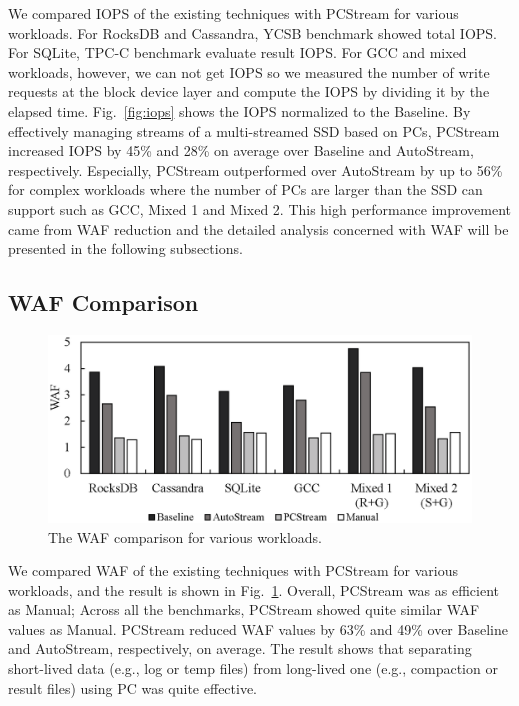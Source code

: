 We compared IOPS of the existing techniques with \textsf{\small PCStream} for various 
workloads.
For RocksDB and Cassandra, YCSB benchmark showed total IOPS.
For SQLite, TPC-C benchmark evaluate result IOPS.
For GCC and mixed workloads, however, we can not get IOPS so
we measured the number of write requests at the block
device layer and compute the IOPS by dividing it by the elapsed time.
Fig.~\ref{fig:iops} shows the IOPS normalized to the \textsf{\small Baseline}.
By effectively managing streams of a multi-streamed SSD based on PCs,
\textsf{\small PCStream} increased IOPS by 45\% and 28\% on average over
\textsf{\small Baseline} and \textsf{\small AutoStream}, respectively.
Especially, \textsf{\small PCStream} outperformed over \textsf{\small AutoStream}
by up to 56\% for complex workloads where the number of PCs are larger than 
the SSD can support such as GCC, Mixed 1 and Mixed 2.
This high performance improvement came from WAF reduction and the 
detailed analysis concerned with WAF will be presented in the following subsections.

\subsection{WAF Comparison}

\begin{figure}[t]
	\centering
	\includegraphics[width=0.9\linewidth]{figure/waf}
	\caption{The WAF comparison for various workloads.}
	\label{fig:waf}
	\vspace{-10pt}
\end{figure}

We compared WAF of the existing techniques with \textsf{\small PCStream} for various
workloads, and the result is shown in Fig.~\ref{fig:waf}.  Overall,
\textsf{\small PCStream} was as efficient as \textsf{\small Manual}; Across all the
benchmarks, \textsf{\small PCStream} showed quite similar WAF values as
\textsf{\small Manual}. \textsf{\small PCStream} reduced WAF values by 63\% and 49\% over
\textsf{\small Baseline} and \textsf{\small AutoStream}, respectively, on average.  The
result shows that separating short-lived data (e.g., log or temp files) from
long-lived one (e.g., compaction or result files) using PC was quite effective.

